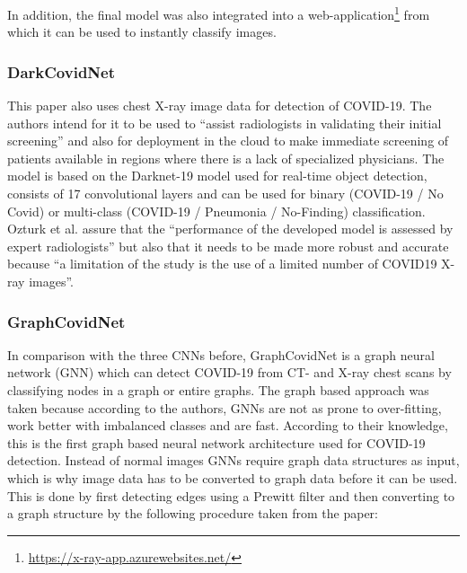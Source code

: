 In addition, the final model was also integrated into a web-application\footnote{\url{https://x-ray-app.azurewebsites.net/}} from which it can be used to instantly classify images.

\subsubsection{DarkCovidNet}
This paper also uses chest X-ray image data for detection of COVID-19. The authors intend for it to be used to \enquote{assist radiologists in validating their initial screening}\cite{dark_net} and also for deployment in the cloud to make immediate screening of patients available in regions where there is a lack of specialized physicians. The model is based on the Darknet-19 model used for real-time object detection\cite{darknet_19}, consists of 17 convolutional layers and can be used for binary (COVID-19 / No Covid) or multi-class (COVID-19 / Pneumonia / No-Finding) classification.
Ozturk et al. assure that the \enquote{performance of the developed model is assessed by expert radiologists} but also that it needs to be made more robust and accurate because \enquote{a limitation of the study is the use of a limited number of COVID19 X-ray images}\cite{dark_net}.

\subsubsection{GraphCovidNet}\label{subsubsec:methods_graphcovidnet}
In comparison with the three CNNs before, GraphCovidNet is a graph neural network (GNN) which can detect COVID-19 from CT- and X-ray chest scans by classifying nodes in a graph or entire graphs. The graph based approach was taken because according to the authors, GNNs are not as prone to over-fitting, work better with imbalanced classes and are fast\cite{graph_covid_net}. According to their knowledge, this is the first graph based neural network architecture used for COVID-19 detection.
Instead of normal images GNNs require graph data structures as input, which is why image data has to be converted to graph data before it can be used. This is done by first detecting edges using a Prewitt filter and then converting to a graph structure by the following procedure taken from the paper:

